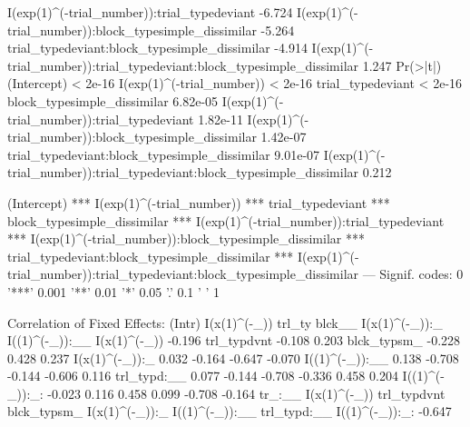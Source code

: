 \documentclass[10pt, letterpaper]{article}
\newenvironment{CodeChunk}{}{}
\begin{document}
\begin{CodeChunk}
\begin{CodeOutput}
I(exp(1)^(-trial_number)):trial_typedeviant                              -6.724
I(exp(1)^(-trial_number)):block_typesimple_dissimilar                    -5.264
trial_typedeviant:block_typesimple_dissimilar                            -4.914
I(exp(1)^(-trial_number)):trial_typedeviant:block_typesimple_dissimilar   1.247
                                                                        Pr(>|t|)
(Intercept)                                                              < 2e-16
I(exp(1)^(-trial_number))                                                < 2e-16
trial_typedeviant                                                        < 2e-16
block_typesimple_dissimilar                                             6.82e-05
I(exp(1)^(-trial_number)):trial_typedeviant                             1.82e-11
I(exp(1)^(-trial_number)):block_typesimple_dissimilar                   1.42e-07
trial_typedeviant:block_typesimple_dissimilar                           9.01e-07
I(exp(1)^(-trial_number)):trial_typedeviant:block_typesimple_dissimilar    0.212
                                                                           
(Intercept)                                                             ***
I(exp(1)^(-trial_number))                                               ***
trial_typedeviant                                                       ***
block_typesimple_dissimilar                                             ***
I(exp(1)^(-trial_number)):trial_typedeviant                             ***
I(exp(1)^(-trial_number)):block_typesimple_dissimilar                   ***
trial_typedeviant:block_typesimple_dissimilar                           ***
I(exp(1)^(-trial_number)):trial_typedeviant:block_typesimple_dissimilar    
---
Signif. codes:  0 '***' 0.001 '**' 0.01 '*' 0.05 '.' 0.1 ' ' 1

Correlation of Fixed Effects:
               (Intr) I(x(1)^(-_)) trl_ty blck__ I(x(1)^(-_)):_ I((1)^(-_)):__
I(x(1)^(-_))   -0.196                                                         
trl_typdvnt    -0.108  0.203                                                  
blck_typsm_    -0.228  0.428        0.237                                     
I(x(1)^(-_)):_  0.032 -0.164       -0.647 -0.070                              
I((1)^(-_)):__  0.138 -0.708       -0.144 -0.606  0.116                       
trl_typd:__     0.077 -0.144       -0.708 -0.336  0.458          0.204        
I((1)^(-_)):_: -0.023  0.116        0.458  0.099 -0.708         -0.164        
               tr_:__
I(x(1)^(-_))         
trl_typdvnt          
blck_typsm_          
I(x(1)^(-_)):_       
I((1)^(-_)):__       
trl_typd:__          
I((1)^(-_)):_: -0.647
\end{CodeOutput}
\end{CodeChunk}
\end{document}
